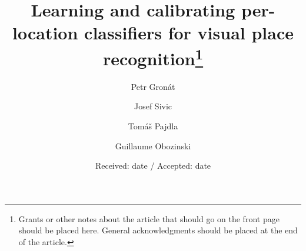 \renewcommand{\algorithmicrequire}{\textbf{Input:}}
\renewcommand{\algorithmicensure}{\textbf{Output:}}
%
%


\title{Learning and calibrating per-location classifiers for visual place recognition\thanks{Grants or other notes
about the article that should go on the front page should be
placed here. General acknowledgments should be placed at the end of the article.}
}


\author{Petr Gron{\'a}t         \and
        Josef {S}ivic          \and
        Tom{\'a}{\v s} Pajdla   \and
        Guillaume Obozinski%
}


\vspace{-5mm}
\date{Received: date / Accepted: date}


